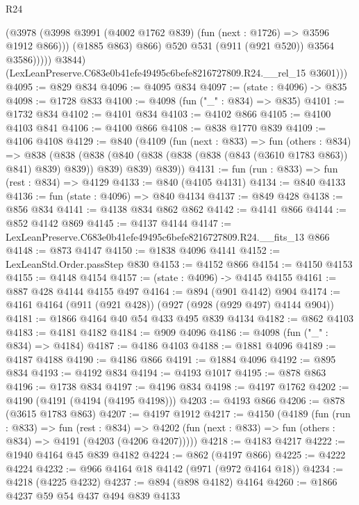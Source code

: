 \begin{lexlean}{R24}
\begin{coremodule}
                      (@3978
                        (@3998 @3991 (@4002 @1762 @839) (fun (next : @1726) => @3596 @1912 @866)))
                      (@1885 @863)
                      @866)
                    @520
                    @531
                    (@911 (@921 @520))
                    @3564
                    @3586)))))
          @3844)
        (LexLeanPreserve.C683e0b41efe49495c6befe8216727809.R24.__rel_15 @3601)))
@4095 := @829 @834
@4096 := @4095 @834
@4097 := (state : @4096) -> @835
@4098 := @1728 @833
@4100 := @4098 (fun ("_" : @834) => @835)
@4101 := @1732 @834
@4102 := @4101 @834
@4103 := @4102 @866
@4105 := @4100 @4103 @841
@4106 := @4100 @866
@4108 := @838 @1770 @839
@4109 := @4106 @4108
@4129 := @840
    (@4109
      (fun (next : @833) =>
      fun (others : @834) =>
      @838
        (@838 (@838 (@840 (@838 (@838 (@838 (@843 (@3610 @1783 @863)) @841) @839) @839)) @839) @839)
        @839))
@4131 := fun (run : @833) => fun (rest : @834) => @4129
@4133 := @840 (@4105 @4131)
@4134 := @840 @4133
@4136 := fun (state : @4096) => @840 @4134
@4137 := @849 @428
@4138 := @856 @834
@4141 := @4138 @834 @862 @862
@4142 := @4141 @866
@4144 := @852 @4142 @869
@4145 := @4137 @4144
@4147 := LexLeanPreserve.C683e0b41efe49495c6befe8216727809.R24.__fits_13 @866
@4148 := @873 @4147
@4150 := @1838 @4096 @4141
@4152 := LexLeanStd.Order.passStep @830
@4153 := @4152 @866
@4154 := @4150 @4153
@4155 := @4148 @4154
@4157 := (state : @4096) -> @4145 @4155
@4161 := @887 @428 @4144 @4155 @497
@4164 := @894 (@901 @4142) @904
@4174 := @4161 @4164 (@911 (@921 @428)) (@927 (@928 (@929 @497) @4144 @904))
@4181 := @1866 @4164 @40 @54 @433 @495 @839 @4134
@4182 := @862 @4103
@4183 := @4181 @4182
@4184 := @909 @4096
@4186 := @4098 (fun ("_" : @834) => @4184)
@4187 := @4186 @4103
@4188 := @1881 @4096
@4189 := @4187 @4188
@4190 := @4186 @866
@4191 := @1884 @4096
@4192 := @895 @834
@4193 := @4192 @834
@4194 := @4193 @1017
@4195 := @878 @863
@4196 := @1738 @834
@4197 := @4196 @834
@4198 := @4197 @1762
@4202 := @4190 (@4191 (@4194 (@4195 @4198)))
@4203 := @4193 @866
@4206 := @878 (@3615 @1783 @863)
@4207 := @4197 @1912
@4217 := @4150
    (@4189
      (fun (run : @833) =>
      fun (rest : @834) =>
      @4202 (fun (next : @833) => fun (others : @834) => @4191 (@4203 (@4206 @4207)))))
@4218 := @4183 @4217
@4222 := @1940 @4164 @45 @839 @4182
@4224 := @862 (@4197 @866)
@4225 := @4222 @4224
@4232 := @966 @4164 @18 @4142 (@971 (@972 @4164 @18))
@4234 := @4218 (@4225 @4232)
@4237 := @894 (@898 @4182) @4164
@4260 := @1866
    @4237
    @59
    @54
    @437
    @494
    @839
    @4133

\end{coremodule}
\end{lexlean}
